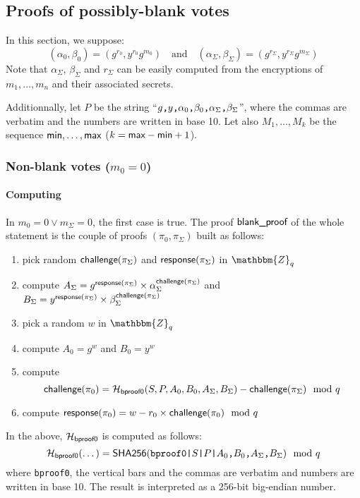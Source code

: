 \documentclass[a4paper]{article}
\newcommand{\Z}{\mathbbm{Z}}
\newcommand{\shatwo}{\textsf{SHA256}}
\begin{document}
\subsection{Proofs of possibly-blank votes}
\label{bproof}

In this section, we suppose:
\[
(\alpha_0,\beta_0)=(g^{r_0},y^{r_0}g^{m_0})
\quad\text{and}\quad
(\alpha_\Sigma,\beta_\Sigma)=(g^{r_\Sigma},y^{r_\Sigma}g^{m_\Sigma})
\]
Note that $\alpha_\Sigma$, $\beta_\Sigma$ and $r_\Sigma$ can be easily
computed from the encryptions of $m_1,\dotsc,m_n$ and their associated
secrets.

Additionnally, let $P$ be the string
``$g\verb=,=y\verb=,=\alpha_0\verb=,=\beta_0\verb=,=\alpha_\Sigma\verb=,=\beta_\Sigma$'',
where the commas are verbatim and the numbers are written in base
10. Let also $M_1,\dotsc,M_k$ be the sequence
$\textsf{min},\dots,\textsf{max}$ ($k=\textsf{max}-\textsf{min}+1$).

\subsubsection{Non-blank votes ($m_0=0$)}
\label{non-blank-votes}

\paragraph{Computing \bproof}
In $m_0=0\lor m_\Sigma=0$, the first case is true. The proof $\textsf{blank\_proof}$
of the whole statement is the couple of proofs $(\pi_0,\pi_\Sigma)$
built as follows:
\begin{enumerate}
\item pick random $\textsf{challenge}(\pi_\Sigma)$ and $\textsf{response}(\pi_\Sigma)$
  in $\Z_q$
\item compute
  $A_\Sigma=g^{\textsf{response}(\pi_\Sigma)}\times\alpha_\Sigma^{\textsf{challenge}(\pi_\Sigma)}$
  and
  $B_\Sigma=y^{\textsf{response}(\pi_\Sigma)}\times\beta_\Sigma^{\textsf{challenge}(\pi_\Sigma)}$
\item pick a random $w$ in $\Z_q$
\item compute $A_0=g^w$ and $B_0=y^w$
\item compute \[\textsf{challenge}(\pi_0)=\mathcal{H}_{\mathsf{bproof0}}(S,P,A_0,B_0,A_\Sigma,B_\Sigma)-\textsf{challenge}(\pi_\Sigma)\mod q\]
\item compute $\textsf{response}(\pi_0)=w-r_0\times\textsf{challenge}(\pi_0)\mod q$
\end{enumerate}
In the above, $\mathcal{H}_{\mathsf{bproof0}}$ is computed as follows:
\[\Hash_{\mathsf{bproof0}}(\dotsc)=
\shatwo(\verb=bproof0|=S\verb=|=P\verb=|=A_0\verb=,=B_0\verb=,=A_\Sigma\verb=,=B_\Sigma)\mod q\]
where \verb=bproof0=, the vertical bars and the commas are verbatim and
numbers are written in base 10. The result is interpreted as a 256-bit
big-endian number.
\end{document}
